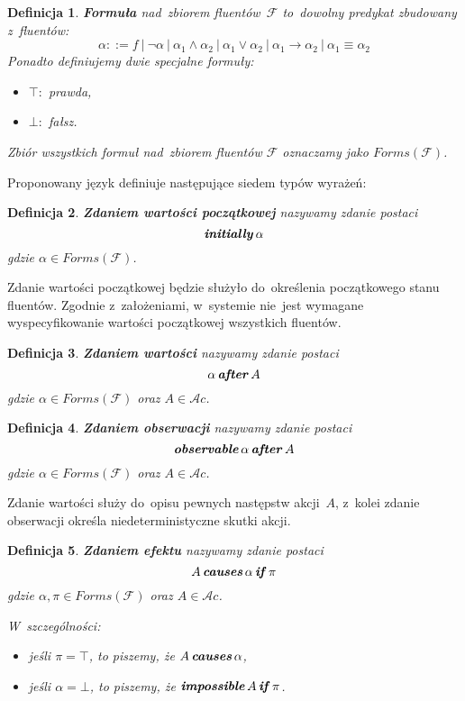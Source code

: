 \documentclass[11pt,a4paper]{article}
\newtheorem{defn}{Definicja}
\DeclareMathOperator{\Initially}{\textbf{\textit{initially}}}
\DeclareMathOperator{\After}{\textbf{\textit{after}}}
\DeclareMathOperator{\Observable}{\textbf{\textit{observable}}}
\DeclareMathOperator{\Causes}{\textbf{\textit{causes}}}
\DeclareMathOperator{\If}{\textbf{\textit{if}}}
\DeclareMathOperator{\Impossible}{\textbf{\textit{impossible}}}
\begin{document}
\begin{defn}
    \textbf{Formuła} nad~zbiorem fluentów~$\mathcal{F}$ to~dowolny predykat zbudowany z~fluentów: 
    $$ \alpha ::= f\ |\ \neg\alpha\ |\ \alpha_1 \land \alpha_2\ |\ \alpha_1 \lor \alpha_2\ |\ \alpha_1 \rightarrow \alpha_2\ |\ \alpha_1 \equiv \alpha_2 $$
    Ponadto definiujemy dwie specjalne formuły:
    
    \begin{itemize}
    \item $\top\colon$ prawda,
    
    \item $\bot\colon$ fałsz.
    \end{itemize}
    
    Zbiór wszystkich formuł nad~zbiorem fluentów $\mathcal{F}$ oznaczamy jako $Forms(\mathcal{F})$.
\end{defn}

Proponowany język definiuje następujące siedem typów wyrażeń:

\begin{defn}
    \textbf{Zdaniem wartości początkowej} nazywamy zdanie postaci
    $$ \Initially \alpha $$
    gdzie $\alpha \in Forms(\mathcal{F})$.
\end{defn}

Zdanie wartości początkowej będzie służyło do~określenia początkowego stanu fluentów.
Zgodnie z~założeniami, w~systemie nie~jest wymagane wyspecyfikowanie wartości początkowej wszystkich fluentów.

\begin{defn}
    \textbf{Zdaniem wartości} nazywamy zdanie postaci
    $$ \alpha \After A $$
    gdzie $\alpha \in Forms(\mathcal{F})$ oraz $A \in \mathcal{A}c$.
\end{defn}

\begin{defn}
    \textbf{Zdaniem obserwacji} nazywamy zdanie postaci
    $$ \Observable \alpha \After A $$
    gdzie $\alpha \in Forms(\mathcal{F})$ oraz $A \in \mathcal{A}c$.
\end{defn}

Zdanie wartości służy do~opisu pewnych następstw akcji~$A$, z~kolei zdanie obserwacji określa niedeterministyczne skutki akcji.

\begin{defn}
    \textbf{Zdaniem efektu} nazywamy zdanie postaci
    $$A \Causes \alpha \If \pi$$
    gdzie $\alpha, \pi \in Forms(\mathcal{F})$ oraz $A \in \mathcal{A}c$.

    W~szczególności:
    \begin{itemize}
        \item jeśli $\pi = \top$, to piszemy, że $A \Causes \alpha$,
        \item jeśli $\alpha = \bot$, to piszemy, że $\Impossible A \If \pi$.
    \end{itemize}
\end{defn}
\end{document}
